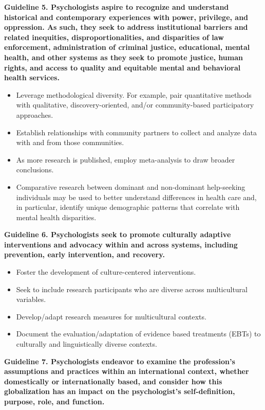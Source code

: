 \documentclass[
  english,
]{book}
\providecommand{\tightlist}{%
  \setlength{\itemsep}{0pt}\setlength{\parskip}{0pt}}
\begin{document}
\textbf{Guideline 5. Psychologists aspire to recognize and understand historical and contemporary experiences with power, privilege, and oppression. As such, they seek to address institutional barriers and related inequities, disproportionalities, and disparities of law enforcement, administration of criminal justice, educational, mental health, and other systems as they seek to promote justice, human rights, and access to quality and equitable mental and behavioral health services.}

\begin{itemize}
\tightlist
\item
  Leverage methodological diversity. For example, pair quantitative methods with qualitative, discovery-oriented, and/or community-based participatory approaches.
\item
  Establish relationships with community partners to collect and analyze data with and from those communities.
\item
  As more research is published, employ meta-analysis to draw broader conclusions.
\item
  Comparative research between dominant and non-dominant help-seeking individuals may be used to better understand differences in health care and, in particular, identify unique demographic patterns that correlate with mental health disparities.
\end{itemize}

\textbf{Guideline 6. Psychologists seek to promote culturally adaptive interventions and advocacy within and across systems, including prevention, early intervention, and recovery.}

\begin{itemize}
\tightlist
\item
  Foster the development of culture-centered interventions.
\item
  Seek to include research participants who are diverse across multicultural variables.
\item
  Develop/adapt research measures for multicultural contexts.
\item
  Document the evaluation/adaptation of evidence based treatments (EBTs) to culturally and linguistically diverse contexts.
\end{itemize}

\textbf{Guideline 7. Psychologists endeavor to examine the profession's assumptions and practices within an international context, whether domestically or internationally based, and consider how this globalization has an impact on the psychologist's self-definition, purpose, role, and function.}
\end{document}

